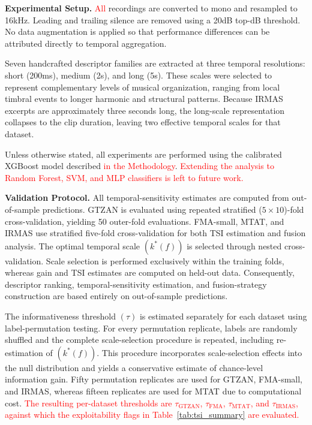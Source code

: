 \documentclass[runningheads]{llncs}
\begin{document}
\textbf{Experimental Setup.} \textcolor{red}{All} recordings are converted to mono and resampled to 16kHz. Leading and trailing silence are removed using a 20dB top-dB threshold. No data augmentation is applied so that performance differences can be attributed directly to temporal aggregation.

Seven handcrafted descriptor families are extracted at three temporal resolutions: short (200ms), medium (2s), and long (5s). These scales were selected to represent complementary levels of musical organization, ranging from local timbral events to longer harmonic and structural patterns. Because IRMAS excerpts are approximately three seconds long, the long-scale representation collapses to the clip duration, leaving two effective temporal scales for that dataset.

Unless otherwise stated, all experiments are performed using the calibrated XGBoost model described \textcolor{red}{in the Methodology}. \textcolor{red}{Extending the analysis to Random Forest, SVM, and MLP classifiers is left to future work.}

\textbf{Validation Protocol.} All temporal-sensitivity estimates are computed from out-of-sample predictions. GTZAN is evaluated using repeated stratified ($5\times10$)-fold cross-validation, yielding 50 outer-fold evaluations. FMA-small, MTAT, and IRMAS use stratified five-fold cross-validation for both TSI estimation and fusion analysis. The optimal temporal scale $(k^*(f))$ is selected through nested cross-validation. Scale selection is performed exclusively within the training folds, whereas gain and TSI estimates are computed on held-out data. Consequently, descriptor ranking, temporal-sensitivity estimation, and fusion-strategy construction are based entirely on out-of-sample predictions.

The informativeness threshold $(\tau)$ is estimated separately for each dataset using label-permutation testing. For every permutation replicate, labels are randomly shuffled and the complete scale-selection procedure is repeated, including re-estimation of $(k^*(f))$. This procedure incorporates scale-selection effects into the null distribution and yields a conservative estimate of chance-level information gain. Fifty permutation replicates are used for GTZAN, FMA-small, and IRMAS, whereas fifteen replicates are used for MTAT due to computational cost. \textcolor{red}{The resulting per-dataset thresholds are $\tau_{\text{GTZAN}}$, $\tau_{\text{FMA}}$, $\tau_{\text{MTAT}}$, and $\tau_{\text{IRMAS}}$, against which the exploitability flags in Table~\ref{tab:tsi_summary} are evaluated.}
\end{document}
